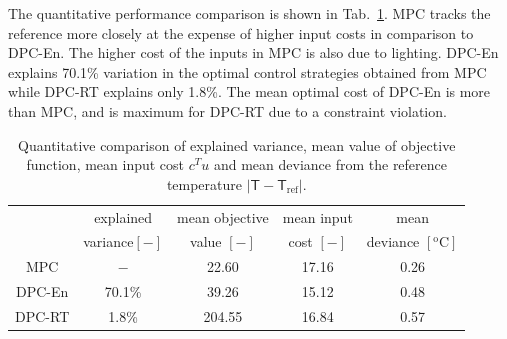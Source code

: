 The quantitative performance comparison is shown in Tab.~\ref{T:comparison}. MPC tracks the reference more closely at the expense of higher input costs in comparison to DPC-En. The higher cost of the inputs in MPC is also due to lighting. DPC-En explains 70.1\% variation in the optimal control strategies obtained from MPC while DPC-RT explains only 1.8\%. The mean optimal cost of DPC-En is more than MPC, and is maximum for DPC-RT due to a constraint violation.

\begin{table}[h!]
	\centering
	\caption{Quantitative comparison of explained variance, mean value of objective function, mean input cost $c^Tu$ and mean deviance from the reference temperature $|\mathsf{T}-\mathsf{T}_{\mathrm{ref}}|$.}
	\captionsetup{justification=centering}
	\begin{tabular}{c|c|c|c|c}
		\toprule
		& explained & mean objective& mean input  & mean  \\
		&  variance$[\mathrm{-}]$ & value $[\mathrm{-}]$ & cost $[-]$ & deviance $[\mathrm{^oC}]$ \\     
		\midrule
		MPC    &  $\mathrm{-}$ &  22.60 & 17.16  &  0.26  \\
		DPC-En   & 70.1\% &  39.26  & 15.12 &  0.48 \\
		DPC-RT  & 1.8\% & 204.55 & 16.84 &  0.57 \\
		\bottomrule
	\end{tabular}
	\label{T:comparison}
\end{table}
